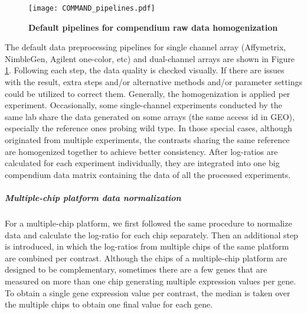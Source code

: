 \begin{figure}
  \centering
  \texttt{[image: COMMAND\_pipelines.pdf]}
  \caption[Default pipelines for compendium raw data homogenization]{
    \textbf{Default pipelines for compendium raw data homogenization}}
  \label{fig:command-pipelines}
\end{figure}

The default data preprocessing pipelines for single channel array (Affymetrix,  NimbleGen, Agilent one-color, etc) and dual-channel arrays are shown in Figure  \ref{fig:command-pipelines}. Following each step, the data quality is checked visually.  If there are issues with the result, extra steps and/or alternative methods and/or parameter settings could be utilized to correct them. Generally, the homogenization is applied per experiment.   Occasionally, some single-channel experiments conducted by the same lab share the data generated on some arrays (the same access id in GEO), especially the reference ones probing wild type. In those special cases, although originated from multiple experiments, the contrasts sharing the same reference are homogenized together to achieve better consistency. After log-ratios are calculated for each experiment individually, they are integrated into one big compendium data matrix containing the data of all the processed experiments.

\subparagraph{Multiple-chip platform data normalization}\label{sec:command-multichip-norm}
For a multiple-chip platform, we first followed the same procedure to normalize data and calculate the log-ratio for each chip separately. Then an additional step is introduced, in which the log-ratios from multiple chips of the same platform are combined per contrast. Although the chips of a multiple-chip platform are designed to be complementary, sometimes there are a few genes that are measured on more than one chip generating multiple expression values per gene. To obtain a single gene expression value per contrast, the median is taken over the multiple chips to obtain one final value for each gene.



